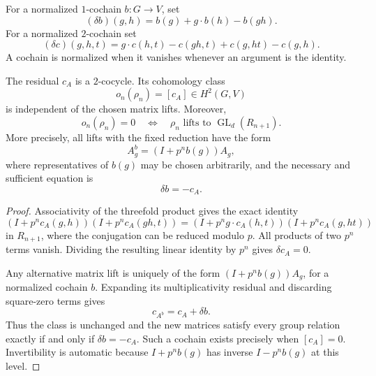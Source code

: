 For a normalized $1$-cochain $b:G\to V$, set
\[
 (\delta b)(g,h)=b(g)+g\cdot b(h)-b(gh).
\]
For a normalized $2$-cochain set
\[
 (\delta c)(g,h,t)=g\cdot c(h,t)-c(gh,t)+c(g,ht)-c(g,h).
\]
A cochain is normalized when it vanishes whenever an argument is the identity.

\begin{theorem}\label{thm:relation-H2}
The residual $c_A$ is a $2$-cocycle. Its cohomology class
\[
 o_n(\rho_n)=[c_A]\in H^2(G,V)
\]
is independent of the chosen matrix lifts. Moreover,
\[
 \boxed{o_n(\rho_n)=0
 \quad\Longleftrightarrow\quad
 \rho_n\text{ lifts to }\operatorname{GL}_d(R_{n+1}).}
\]
More precisely, all lifts with the fixed reduction have the form
\[
 A_g^b=(I+p^n b(g))A_g,
\]
where representatives of $b(g)$ may be chosen arbitrarily, and the necessary and sufficient equation is
\[
 \boxed{\delta b=-c_A.}
\]
\end{theorem}
\begin{proof}
Associativity of the threefold product gives the exact identity
\[
 (I+p^nc_A(g,h))(I+p^nc_A(gh,t))
 = (I+p^n g\cdot c_A(h,t))(I+p^nc_A(g,ht))
\]
in $R_{n+1}$, where the conjugation can be reduced modulo $p$. All products of two $p^n$ terms vanish. Dividing the resulting linear identity by $p^n$ gives $\delta c_A=0$.

Any alternative matrix lift is uniquely of the form $(I+p^nb(g))A_g$, for a normalized cochain $b$. Expanding its multiplicativity residual and discarding square-zero terms gives
\[
 c_{A^b}=c_A+\delta b.
\]
Thus the class is unchanged and the new matrices satisfy every group relation exactly if and only if $\delta b=-c_A$. Such a cochain exists precisely when $[c_A]=0$. Invertibility is automatic because $I+p^nb(g)$ has inverse $I-p^nb(g)$ at this level.
\end{proof}

